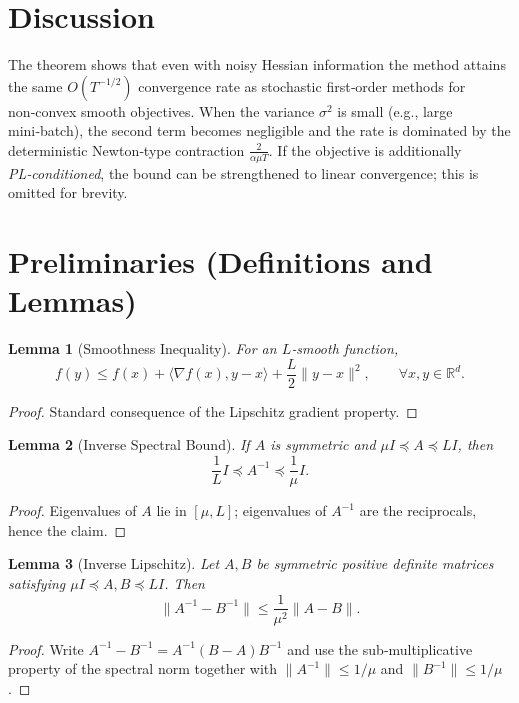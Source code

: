 \documentclass[11pt]{article}
\newtheorem{lemma}{Lemma}
\newcommand{\R}{\mathbb{R}}
\begin{document}
\section*{Discussion}
The theorem shows that even with noisy Hessian information the method attains
the same $O(T^{-1/2})$ convergence rate as stochastic first‑order methods for
non‑convex smooth objectives.  When the variance $\sigma^{2}$ is small (e.g.,
large mini‑batch), the second term becomes negligible and the rate is
dominated by the deterministic Newton‑type contraction $\frac{2}{\alpha\mu T}$.
If the objective is additionally \emph{PL‑conditioned}, the bound can be
strengthened to linear convergence; this is omitted for brevity.

\newpage
\section*{Preliminaries (Definitions and Lemmas)}
\begin{lemma}[Smoothness Inequality]\label{lem:smooth}
For an $L$‑smooth function,
\[
f(y)\le f(x)+\langle\nabla f(x),y-x\rangle+\frac{L}{2}\|y-x\|^{2},
\qquad\forall x,y\in\R^{d}.
\]
\end{lemma}
\begin{proof}
Standard consequence of the Lipschitz gradient property. \qedhere
\end{proof}

\begin{lemma}[Inverse Spectral Bound]\label{lem:inv}
If $A$ is symmetric and $\mu I\preceq A\preceq L I$, then
\[
\frac{1}{L} I\preceq A^{-1}\preceq \frac{1}{\mu} I.
\]
\end{lemma}
\begin{proof}
Eigenvalues of $A$ lie in $[\mu,L]$; eigenvalues of $A^{-1}$ are the reciprocals,
hence the claim. \qedhere
\end{proof}

\begin{lemma}[Inverse Lipschitz]\label{lem:inv-lip}
Let $A,B$ be symmetric positive definite matrices satisfying
$\mu I\preceq A,B\preceq L I$. Then
\[
\big\|A^{-1}-B^{-1}\big\|\le \frac{1}{\mu^{2}}\big\|A-B\big\|.
\]
\end{lemma}
\begin{proof}
Write $A^{-1}-B^{-1}=A^{-1}(B-A)B^{-1}$ and use the sub‑multiplicative property of the
spectral norm together with $\|A^{-1}\|\le 1/\mu$ and $\|B^{-1}\|\le 1/\mu$.
\qedhere
\end{proof}
\end{document}
